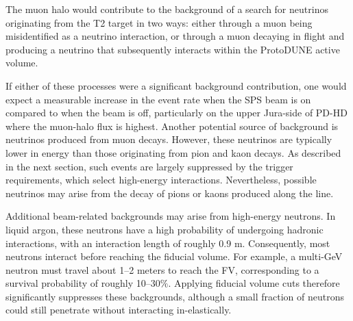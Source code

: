 The muon halo would contribute to the background of a search for neutrinos originating from the T2 target in two ways: either through a muon being misidentified as a neutrino interaction, or through a muon decaying in flight and producing a neutrino that subsequently interacts within the ProtoDUNE active volume.

If either of these processes were a significant background contribution, one would expect a measurable increase in the event rate when the SPS beam is on compared to when the beam is off, particularly on the upper Jura-side of PD-HD where the muon-halo flux is highest. Another potential source of background is neutrinos produced from muon decays. However, these neutrinos are typically lower in energy than those originating from pion and kaon decays. As described in the next section, such events are largely suppressed by the trigger requirements, which select high-energy interactions. Nevertheless, possible neutrinos may arise from the decay of pions or kaons produced along the line.

Additional beam-related backgrounds may arise from high-energy neutrons. In liquid argon, these neutrons have a high probability of undergoing hadronic interactions, with an interaction length of roughly 0.9 m. Consequently, most neutrons interact before reaching the fiducial volume. For example, a multi-GeV neutron must travel about 1–2 meters to reach the FV, corresponding to a survival probability of roughly 10–30$\%$. Applying fiducial volume cuts therefore significantly suppresses these backgrounds, although a small fraction of neutrons could still penetrate without interacting in-elastically.

